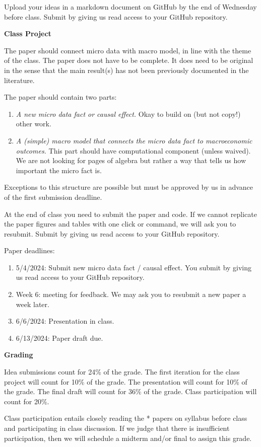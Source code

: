 \documentclass [12pt]{article}
\begin{document}
Upload your ideas in a markdown document on GitHub by the end of Wednesday before class. Submit by giving us read access to your GitHub repository.

\noindent  \textbf{Class Project}

The paper should connect micro data with macro model, in line with the theme of the class. The paper does not have to be complete. It does need to be original in the sense that the main result(s) has not been previously documented in the literature.

The paper should contain two parts:
\begin{enumerate}
	\item \emph{A new micro data fact or causal effect.} Okay to build on (but not copy!) other work.
	\item \emph{A (simple) macro model that connects the micro data fact to macroeconomic outcomes.}  This part should have computational component (unless waived). We are not looking for pages of algebra but rather a way that tells us how important the micro fact is.
\end{enumerate}
Exceptions to this structure are possible but must be approved by us in advance of the first submission deadline.

At the end of class you need to submit the paper and code. If we cannot replicate the paper figures and tables with one click or command, we will ask you to resubmit. Submit by giving us read access to your GitHub repository.

Paper deadlines:
\begin{enumerate}
	\item 5/4/2024: Submit new micro data fact / causal effect.  You submit by giving us read access to your GitHub repository.
	\item Week 6: meeting for feedback. We may ask you to resubmit a new paper a week later.
	\item 6/6/2024: Presentation in class.
	\item 6/13/2024: Paper draft due.
\end{enumerate}


\noindent  \textbf{Grading}

\noindent Idea submissions count for 24\% of the grade. The first iteration for the class project will count for 10\% of the grade. The presentation will count for 10\% of the grade. The final draft will count for 36\% of the grade. Class participation will count for 20\%.

Class participation entails closely reading the * papers on syllabus before class and participating in class discussion. If we judge that there is insufficient participation, then we will schedule a midterm and/or final to assign this grade.
\end{document}
